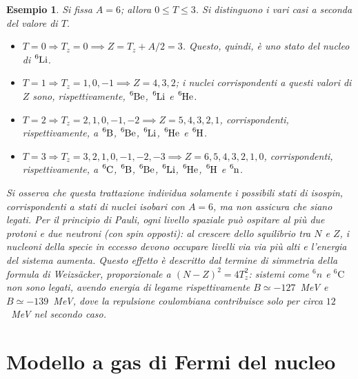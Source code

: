 \documentclass[11pt, a4paper]{scrartcl}
\theoremstyle{style}
\newtheorem{esempio}{Esempio}[section]
\numberwithin{equation}{subsection}
\begin{document}
\begin{esempio}
Si fissa $A = 6$; allora $0\le T\le 3$. 
Si distinguono i vari casi a seconda del valore di $T$.
\begin{itemize}
	\item $T=0\Rightarrow T_z = 0 \implies Z = T_z + A / 2 = 3$.
		Questo, quindi, \`e uno stato del nucleo di $\ce{^6Li}$.
	\item $T = 1\Rightarrow T_z = 1,0,-1\implies Z = 4,3,2$; i nuclei corrispondenti a questi valori di $Z$ sono, rispettivamente, $\ce{^6Be}$, $\ce{^6Li}$ e $\ce{^6He}$.
	\item $T=2\Rightarrow T_z = 2,1,0,-1,-2\implies Z = 5,4,3,2,1$, corrispondenti, rispettivamente, a $\ce{^6B}$, $\ce{^6Be}$, $\ce{^6Li}$, $\ce{^6He}$ e $\ce{^6H}$.
	\item $T = 3 \Rightarrow  T_z = 3,2,1,0,-1,-2,-3 \implies Z = 6,5,4,3,2,1,0$, corrispondenti, rispettivamente, a $\ce{^6C}$, $\ce{^6B}$, $\ce{^6Be}$, $\ce{^6Li}$, $\ce{^6He}$, $\ce{^6H}$ e $\ce{^6n}$.
\end{itemize}
Si osserva che questa trattazione individua solamente i possibili stati di isospin,
corrispondenti a stati di nuclei isobari con $A=6$, ma non assicura che siano legati.
Per il principio di Pauli, ogni livello spaziale pu\`o ospitare al pi\`u due protoni e
due neutroni (con spin opposti): al crescere dello squilibrio tra $N$ e $Z$, i nucleoni
della specie in eccesso devono occupare livelli via via pi\`u alti e l'energia del
sistema aumenta. Questo effetto \`e descritto dal termine di simmetria della formula di
Weizs\"acker, proporzionale a $(N-Z)^2 = 4T_z^2$: sistemi come ${}^{6}n$ e
${}^{6}\mathrm{C}$ non sono legati, avendo energia di legame rispettivamente
$B \simeq -127$~MeV e $B \simeq -139$~MeV, dove la repulsione coulombiana contribuisce
solo per circa $12$~MeV nel secondo caso.
\end{esempio}


\newpage


\section{Modello a gas di Fermi del nucleo}
\end{document}
